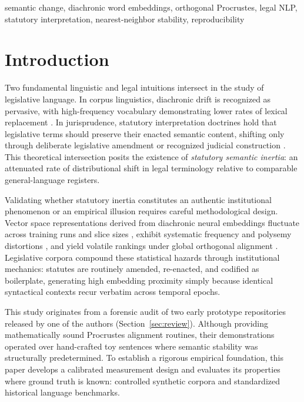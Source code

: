 \documentclass[conference]{IEEEtran}
\begin{document}
\begin{IEEEkeywords}
semantic change, diachronic word embeddings, orthogonal Procrustes, legal NLP, statutory interpretation, nearest-neighbor stability, reproducibility
\end{IEEEkeywords}

\section{Introduction}
Two fundamental linguistic and legal intuitions intersect in the study of legislative language. In corpus linguistics, diachronic drift is recognized as pervasive, with high-frequency vocabulary demonstrating lower rates of lexical replacement \cite{hamilton2016diachronic}. In jurisprudence, statutory interpretation doctrines hold that legislative terms should preserve their enacted semantic content, shifting only through deliberate legislative amendment or recognized judicial construction \cite{scalia2012reading, eskridge1987dynamic, hart1961concept}. This theoretical intersection posits the existence of \textit{statutory semantic inertia}: an attenuated rate of distributional shift in legal terminology relative to comparable general-language registers.

Validating whether statutory inertia constitutes an authentic institutional phenomenon or an empirical illusion requires careful methodological design. Vector space representations derived from diachronic neural embeddings fluctuate across training runs and slice sizes \cite{antoniak2018evaluating, wendlandt2018factors, hellrich2016bad}, exhibit systematic frequency and polysemy distortions \cite{dubossarsky2017outta}, and yield volatile rankings under global orthogonal alignment \cite{gonen2020simple}. Legislative corpora compound these statistical hazards through institutional mechanics: statutes are routinely amended, re-enacted, and codified as boilerplate, generating high embedding proximity simply because identical syntactical contexts recur verbatim across temporal epochs.

This study originates from a forensic audit of two early prototype repositories released by one of the authors (Section~\ref{sec:review}). Although providing mathematically sound Procrustes alignment routines, their demonstrations operated over hand-crafted toy sentences where semantic stability was structurally predetermined. To establish a rigorous empirical foundation, this paper develops a calibrated measurement design and evaluates its properties where ground truth is known: controlled synthetic corpora and standardized historical language benchmarks.
\end{document}
